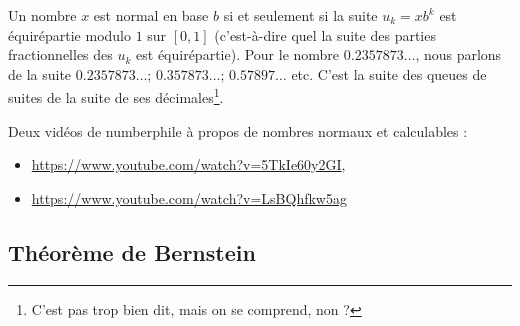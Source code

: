 \begin{remark}  \label{RemUXAkcuH}
	Un nombre \( x\) est normal en base \( b\) si et seulement si la suite  \( u_k=xb^k\) est équirépartie modulo \( 1\) sur \( [0,1]\) (c'est-à-dire quel la suite des parties fractionnelles des \( u_k\) est équirépartie). Pour le nombre \( 0.2357873\ldots\), nous parlons de la suite \( 0.2357873\ldots\); \( 0.357873\ldots\); \( 0.57897\ldots\) etc. C'est la suite des queues de suites de la suite de ses décimales\footnote{C'est pas trop bien dit, mais on se comprend, non ?}.
\end{remark}


Deux vidéos de numberphile à propos de nombres normaux et calculables :
\begin{itemize}
	\item
	      \url{https://www.youtube.com/watch?v=5TkIe60y2GI},
	\item
	      \url{https://www.youtube.com/watch?v=LsBQhfkw5ag}
\end{itemize}

\subsection{Théorème de Bernstein}

